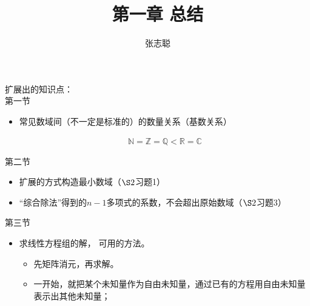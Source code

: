 \documentclass{article}
\begin{document}
\title{第一章 总结}
\author{张志聪}
\maketitle

\begin{zremark}
  扩展出的知识点：\\
  第一节
  \begin{itemize}
    \item 常见数域间（不一定是标准的）的数量关系（基数关系）

          \begin{align*}
            \mathbb{N} = \mathbb{Z} = \mathbb{Q} < \mathbb{R} = \mathbb{C}
          \end{align*}

  \end{itemize}
  第二节
  \begin{itemize}
    \item 扩展的方式构造最小数域（$\S2$习题1）
    \item “综合除法”得到的$n-1$多项式的系数，不会超出原始数域（$\S2$习题3）
  \end{itemize}

  第三节
  \begin{itemize}
    \item 求线性方程组的解， 可用的方法。
          \begin{itemize}
            \item 先矩阵消元，再求解。
            \item 一开始，就把某个未知量作为自由未知量，通过已有的方程用自由未知量表示出其他未知量；
          \end{itemize}
  \end{itemize}
\end{zremark}
\end{document}
